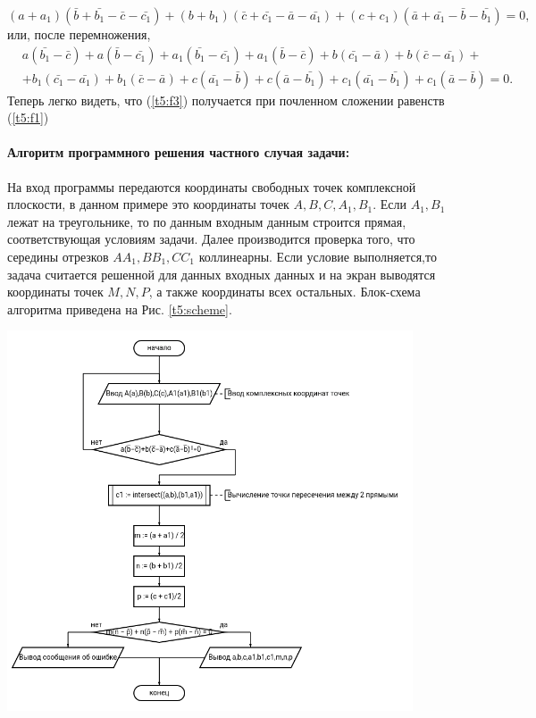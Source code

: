 {   \(
   (a+a_1)(\bar{b}+\bar{b_1}-\bar{c}-\bar{c_1})+(b+b_1 )(\bar{c}+\bar{c_1}-\bar{a}-\bar{a_1})+(c+c_1)(\bar{a}+\bar{a_1}-\bar{b}-\bar{b_1})=0,
   \) или, после перемножения,
   \begin{equation}
      \begin{aligned}
          & a(\bar{b_1} - \bar{c}) + a(\bar{b}- \bar{c_1}) + a_1(\bar{b_1} - \bar{c_1}) + a_1(\bar{b}- \bar{c}) + b(\bar{c_1} - \bar{a}) + b(\bar{c}- \bar{a_1}) + \\
          & +b_1(\bar{c_1}-\bar{a_1})+b_1 (\bar{c}-\bar{a})+c(\bar{a_1}-\bar{b})+c(\bar{a}-\bar{b_1})+c_1 (\bar{a_1}-\bar{b_1} )+c_1(\bar{a}-\bar{b})=0.
      \end{aligned}
      \label{t5:f3}
   \end{equation}
   Теперь легко видеть, что (\ref{t5:f3}) получается при почленном сложении
   равенств (\ref{t5:f1})
   \paragraph{Алгоритм программного решения частного случая задачи:} На вход программы передаются координаты свободных точек комплексной плоскости, в данном примере это координаты точек \(A,B,C,A_1,B_1\). Если \(A_1,B_1\) лежат на треугольнике, то по данным входным данным строится прямая, соответствующая условиям задачи. Далее производится проверка того, что середины отрезков \(AA_1,BB_1,CC_1\) коллинеарны. Если условие выполняется,то задача считается решенной для данных входных данных и на экран выводятся координаты точек \(M,N,P\), а также координаты всех остальных. Блок-схема алгоритма приведена на Рис. \ref{t5:scheme}.
   \begin{center}
      \includegraphics[width=0.9\textwidth]{images/task5-diagram.png}
      \label{t5:scheme}
   \end{center}

}
